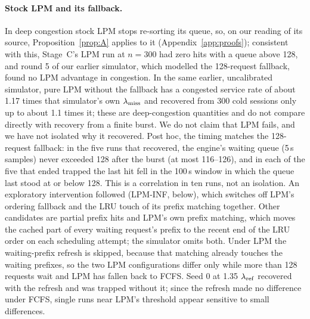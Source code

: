 \paragraph{Stock LPM and its fallback.} In deep congestion stock LPM stops re-sorting its queue, so, on our reading of its source, Proposition~\ref{prop:A} applies to it (Appendix~\ref{app:proofs}); consistent with this, Stage~C's LPM run at $n=300$ had zero hits with a queue above 128, and round 5 of our earlier simulator, which modelled the 128-request fallback, found no LPM advantage in congestion. In the same earlier, uncalibrated simulator, pure LPM without the fallback has a congested service rate of about 1.17 times that simulator's own $\lambda_{\mathrm{miss}}$ and recovered from 300 cold sessions only up to about 1.1 times it; these are deep-congestion quantities and do not compare directly with recovery from a finite burst. We do not claim that LPM fails, and we have not isolated why it recovered. Post hoc, the timing matches the 128-request fallback: in the five runs that recovered, the engine's waiting queue (5\,s samples) never exceeded 128 after the burst (at most 116--126), and in each of the five that ended trapped the last hit fell in the 100\,s window in which the queue last stood at or below 128. This is a correlation in ten runs, not an isolation. An exploratory intervention followed (LPM-INF, below), which switches off LPM's ordering fallback and the LRU touch of its prefix matching together. Other candidates are partial prefix hits and LPM's own prefix matching, which moves the cached part of every waiting request's prefix to the recent end of the LRU order on each scheduling attempt; the simulator omits both. Under LPM the waiting-prefix refresh is skipped, because that matching already touches the waiting prefixes, so the two LPM configurations differ only while more than 128 requests wait and LPM has fallen back to FCFS. Seed 0 at 1.35 $\lambda_{\mathrm{ref}}$ recovered with the refresh and was trapped without it; since the refresh made no difference under FCFS, single runs near LPM's threshold appear sensitive to small differences.

